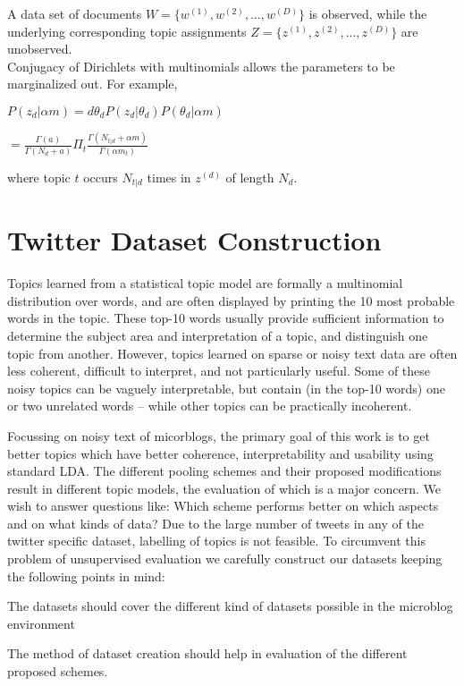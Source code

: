 \documentclass[10pt,a5paper,twoside]{article}
\begin{document}
A data set of documents $W = \lbrace w^(1) , w^(2) , ..., w^(D) \rbrace $ is observed, while the underlying corresponding topic assignments $Z = \lbrace z^(1) , z^(2) , ..., z^(D) \rbrace $ are unobserved. 
\\
Conjugacy of Dirichlets with multinomials allows the  parameters to be marginalized out. For example, 

\begin{center}
$ P\left( z_{d} | \alpha m  \right) =  d\theta_{d}  P\left( z_{d} | \theta_{d}\right) P\left( \theta_{d} | \alpha m  \right)$     
\end{center}

\begin{center}
$= \frac{\Gamma \left( a \right) }{\Gamma \left( N_{d} + a \right)}  \Pi_{t} \frac{\Gamma \left( N_{t|d} + \alpha m \right)}{\Gamma \left( \alpha m_{t} \right)}$
\end{center}

where topic $t$ occurs $N_{t|d}$ times in $z^{\left( d \right)}$ of length $N_{d}$.



\section{Twitter Dataset Construction}

Topics learned from a statistical topic model are formally a multinomial distribution over words, and are often displayed by printing the 10 most probable words in the topic. These top-10 words usually provide sufficient information to determine the subject area and interpretation of a topic, and distinguish one topic from another. However, topics learned on sparse or noisy text data are
often less coherent, difficult to interpret, and not particularly useful. Some of these noisy topics can be vaguely interpretable, but contain (in the top-10 words) one or two unrelated words – while other topics can be practically incoherent. 

Focussing on noisy text of micorblogs, the primary goal of this work is to get better topics which have better coherence, interpretability and usability using standard LDA. The different pooling schemes and their proposed modifications result in different topic models, the evaluation of which is a major concern. We wish to answer questions like: Which scheme performs better on which aspects and on what kinds of data? Due to the large number of tweets in any of the twitter specific dataset, labelling of topics is not feasible. To circumvent this problem of unsupervised evaluation we carefully construct our datasets keeping the following points in mind:
\begin{compactitem}
\item The datasets should cover the different kind of datasets possible in the microblog environment
\item The method of dataset creation should help in evaluation of the different proposed schemes.
\end{compactitem}
\end{document}
